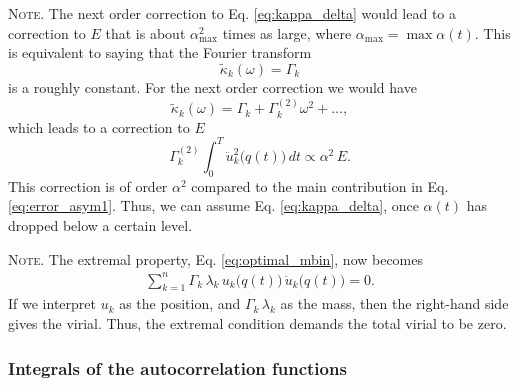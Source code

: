\documentclass[reprint, floatfix]{revtex4-1}
\newcommand{\note}[1]{{\color{DarkGreen}\footnotesize \textsc{Note.} #1}}
\newcommand{\Err}{E}
\begin{document}
\note{The next order correction to Eq. \eqref{eq:kappa_delta}
would lead to a correction to $\Err$
that is about $\alpha_{\max}^2$ times as large,
where $\alpha_{\max} = \max \alpha(t)$.
%
This is equivalent to saying that the Fourier transform
  $$
  \tilde \kappa_k(\omega) = \Gamma_k
  $$
  is a roughly constant.
  For the next order correction we would have
  $$
  \tilde \kappa_k(\omega) = \Gamma_k + \Gamma^{(2)}_k \omega^2 + \dots,
  $$
  which leads to a correction to $\Err$
  $$
  \Gamma^{(2)}_k
  \int_0^T \ddot u_k^2\bigl( q(t) \bigr) \, dt
  \propto
  \alpha^2 \, \Err.
  $$
  This correction is of order $\alpha^2$
  compared to the main contribution in Eq. \eqref{eq:error_asym1}.
  Thus, we can assume Eq. \eqref{eq:kappa_delta},
  once $\alpha(t)$ has dropped below a certain level.
}

\note{
  The extremal property, Eq. \eqref{eq:optimal_mbin},
  now becomes
  \begin{align}
    \sum_{k = 1}^n
      \Gamma_k \, \lambda_k \,
      u_k\bigl( q(t) \bigr) \,
      \ddot u_k\bigl( q(t) \bigr) = 0.
    \label{eq:optimal_mbin1}
  \end{align}
  If we interpret $u_k$ as the position,
  and $\Gamma_k \, \lambda_k$ as the mass,
  then the right-hand side gives the virial.
  Thus, the extremal condition demands
  the total virial to be zero.
  $$\,$$
}



\subsubsection{\label{sec:Gamma}
Integrals of the autocorrelation functions}
\end{document}
